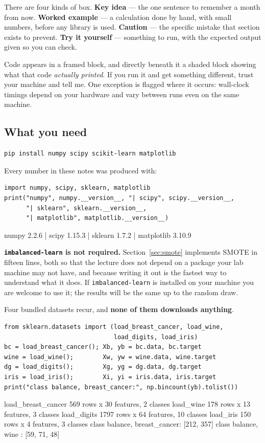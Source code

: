 \documentclass[11pt]{article}
\begin{document}
There are four kinds of box. \textbf{Key idea} --- the one sentence to
remember a month from now. \textbf{Worked example} --- a calculation done by
hand, with small numbers, before any library is used. \textbf{Caution} --- the
specific mistake that section exists to prevent. \textbf{Try it yourself} ---
something to run, with the expected output given so you can check.

Code appears in a framed block, and directly beneath it a shaded block showing
what that code \emph{actually printed}. If you run it and get something
different, trust your machine and tell me. One exception is flagged where it
occurs: wall-clock timings depend on your hardware and vary between runs even
on the same machine.

\subsection{What you need}

\begin{lstlisting}
pip install numpy scipy scikit-learn matplotlib
\end{lstlisting}

Every number in these notes was produced with:

\begin{lstlisting}
import numpy, scipy, sklearn, matplotlib
print("numpy", numpy.__version__, "| scipy", scipy.__version__,
      "| sklearn", sklearn.__version__,
      "| matplotlib", matplotlib.__version__)
\end{lstlisting}
\begin{codeout}
numpy 2.2.6 | scipy 1.15.3 | sklearn 1.7.2 | matplotlib 3.10.9
\end{codeout}

\textbf{\texttt{imbalanced-learn} is not required.} Section~\ref{sec:smote}
implements SMOTE in fifteen lines, both so that the lecture does not depend on
a package your lab machine may not have, and because writing it out is the
fastest way to understand what it does. If \texttt{imbalanced-learn} is
installed on your machine you are welcome to use it; the results will be the
same up to the random draw.

Four bundled datasets recur, and \textbf{none of them downloads anything}.

\begin{lstlisting}
from sklearn.datasets import (load_breast_cancer, load_wine,
                              load_digits, load_iris)
bc = load_breast_cancer(); Xb, yb = bc.data, bc.target
wine = load_wine();        Xw, yw = wine.data, wine.target
dg = load_digits();        Xg, yg = dg.data, dg.target
iris = load_iris();        Xi, yi = iris.data, iris.target
print("class balance, breast_cancer:", np.bincount(yb).tolist())
\end{lstlisting}
\begin{codeout}
load_breast_cancer  569 rows x 30 features, 2 classes
load_wine           178 rows x 13 features, 3 classes
load_digits        1797 rows x 64 features, 10 classes
load_iris           150 rows x  4 features, 3 classes
class balance, breast_cancer: [212, 357]
class balance, wine         : [59, 71, 48]
\end{codeout}
\end{document}
